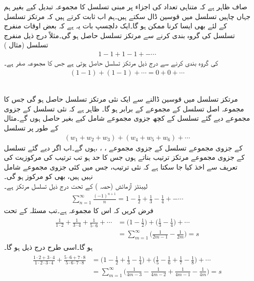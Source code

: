 صاف ظاہر ہے کہ متناہی تعداد کی اجزاء پر مبنی تسلسل کا مجموعہ تبدیل کیے بغیر ہم جہاں چاہیں تسلسل میں قوسین ڈال سکتے ہیں۔ہم اب ثابت کرتے ہیں کہ مرتکز تسلسل کے لئے بھی ایسا کرنا ممکن ہو گا۔ایک دلچسپ بات یہ ہے کہ بعض اوقات منفرج تسلسل کی گروہ بندی کرنے سے مرتکز تسلسل حاصل ہو گی۔مثلاً درج ذیل منفرج تسلسل (مثال )
\begin{align*}
1-1+1-1+-\cdots
\end{align*} 
کی گروہ بندی کرنے سے درج ذیل مرتکز تسلسل حاصل ہوتی ہے جس کا مجموعہ صفر ہے۔
\begin{align*}
(1-1)+(1-1)+\cdots=0+0+\cdots
\end{align*}

\quad {}\\
مرتکز تسلسل میں قوسین ڈالنے سے ایک نئی مرتکز تسلسل حاصل ہو گی جس کا مجموعہ اصل تسلسل کے مجموعے کے برابر ہو گا۔
\quad
ظاہر ہے کہ نئی تسلسل کے جزوی مجموعے دیے گئے تسلسل کے کچھ جزوی مجموعے  شامل کیے بغیر حاصل ہوں گے۔مثال کے طور پر تسلسل
\begin{align*}
(w_1+w_2+w_3)+(w_4+w_5+w_6)+\cdots
\end{align*} 
کے جزوی مجموعے تسلسل  کے جزوی مجموعے  ، ، ، ہوں گے۔اب اگر دیے گئے تسلسل کے جزوی مجموعے  مرتکز ترتیب بناتے ہوں جس کا حد  ہو تب ترتیب کی مرکوزیت کی تعریف سے اخذ کیا جا سکتا ہے کہ نئی ترتیب، جس میں کئی جزوی مجموعے شامل نہیں ہیں، بھی  کو مرکوز ہو گی۔
\quad {}\\
لیبنٹز آزمائش (حصہ ) کے تحت درج ذیل تسلسل مرتکز ہے۔
\begin{align*}
\sum\limits_{n=1}^{\infty} \frac{(-1)^{n+1}}{n}=1-\frac{1}{2}+\frac{1}{3}-\frac{1}{4}+-\cdots
\end{align*}
فرض کریں کہ اس کا مجموعہ  ہے۔تب مسئلہ  کے تحت
\begin{gather}
\begin{aligned}\label{مساوات_ترتیب_تسلسل_ایک}
\frac{1}{1\cdot 2}+\frac{1}{3\cdot 4}+\frac{1}{5\cdot 6}+\cdots&=\big(1-\frac{1}{2}\big)+\big(\frac{1}{3}-\frac{1}{4}\big)+\cdots\\
&=\sum\limits_{m=1}^{\infty}\big(\frac{1}{2m-1}-\frac{1}{2m}\big)=s
\end{aligned}
\end{gather}
ہو گا۔اسی طرح درج ذیل ہو گا۔
\begin{gather}
\begin{aligned}\label{مساوات_ترتیب_تسلسل_دو}
\frac{1\cdot 2+3\cdot 4}{1\cdot 2\cdot 3\cdot 4}+\frac{5\cdot 6+7\cdot 8}{5\cdot 6\cdot 7\cdot 8}&=\big(1-\frac{1}{2}+\frac{1}{3}-\frac{1}{4}\big)+\big(\frac{1}{5}-\frac{1}{6}+\frac{1}{7}-\frac{1}{8}\big)+\cdots\\
&=\sum\limits_{m=1}^{\infty} \big(\frac{1}{4m-3}-\frac{1}{4m-2}+\frac{1}{4m-1}-\frac{1}{4m}\big)=s
\end{aligned}
\end{gather}

